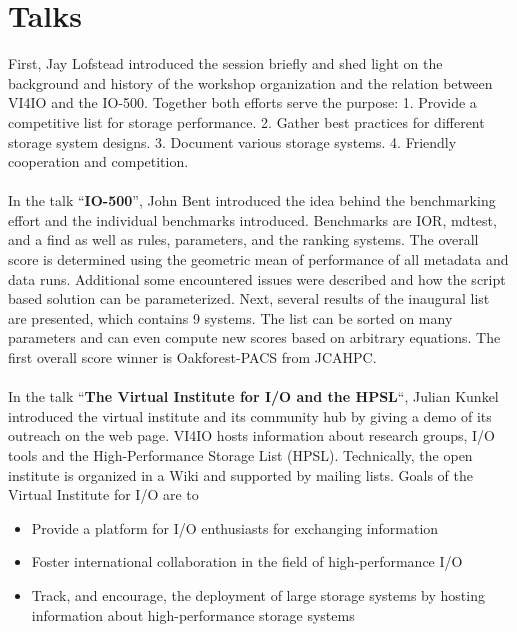 \documentclass{llncs}
\begin{document}
\section{Talks}

\pargraph{}
First, Jay Lofstead introduced the session briefly and shed light on the background and
history of the workshop organization and the relation between VI4IO and the IO-500.
Together both efforts serve the purpose:
1. Provide a competitive list for storage performance.
2. Gather best practices for different storage system designs.
3. Document various storage systems.
4. Friendly cooperation and competition.



\paragraph{}
In the talk “\textbf{IO-500}”, John Bent introduced the idea behind the benchmarking effort and the individual benchmarks introduced.
Benchmarks are IOR, mdtest, and a find as well as  rules, parameters, and the ranking systems.
The overall score is determined using the geometric mean of performance of all metadata and data runs.
Additional some encountered issues were described and how the script based solution can be parameterized.
Next, several results of the inaugural list are presented, which contains 9 systems.
The list can be sorted on many parameters and can even compute new scores based on arbitrary equations.
The first overall score winner is Oakforest-PACS from JCAHPC.


\paragraph{}
In the talk “\textbf{The Virtual Institute for I/O and the HPSL}“, Julian Kunkel introduced the virtual institute and its community hub by giving a demo of its outreach on the web page. VI4IO hosts information about research groups, I/O tools and the High-Performance Storage List (HPSL). Technically, the open institute is organized in a Wiki and supported by mailing lists.
Goals of the Virtual Institute for I/O are to
\begin{itemize}
	\item Provide a platform for I/O enthusiasts for exchanging information
	\item Foster international collaboration in the field of high-performance I/O
	\item Track, and encourage, the deployment of large storage systems by hosting information about high-performance storage systems
\end{itemize}
\end{document}

